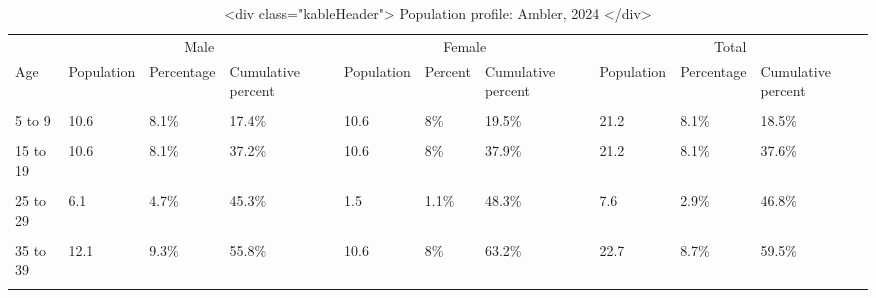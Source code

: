 \documentclass[
]{article}
\begin{document}
\begin{table}
\centering\centering
\caption{\label{tab:pop profile table}<div class="kableHeader"> Population profile: Ambler, 2024 </div>}
\centering
\begin{tabular}[t]{l|l|l|l|l|l|l|l|l|l}
\hline
\multicolumn{1}{c|}{ } & \multicolumn{3}{c|}{Male} & \multicolumn{3}{c|}{Female} & \multicolumn{3}{c}{Total} \\
\cline{2-4} \cline{5-7} \cline{8-10}
Age & Population & Percentage & Cumulative percent & Population & Percent & Cumulative percent & Population & Percentage & Cumulative percent\\
\hline
\cellcolor{gray!10}{0 to 4} & \cellcolor{gray!10}{12.1} & \cellcolor{gray!10}{9.3\%} & \cellcolor{gray!10}{9.3\%} & \cellcolor{gray!10}{15.2} & \cellcolor{gray!10}{11.5\%} & \cellcolor{gray!10}{11.5\%} & \cellcolor{gray!10}{27.3} & \cellcolor{gray!10}{10.4\%} & \cellcolor{gray!10}{10.4\%}\\
\hline
5 to 9 & 10.6 & 8.1\% & 17.4\% & 10.6 & 8\% & 19.5\% & 21.2 & 8.1\% & 18.5\%\\
\hline
\cellcolor{gray!10}{10 to 14} & \cellcolor{gray!10}{15.2} & \cellcolor{gray!10}{11.6\%} & \cellcolor{gray!10}{29.1\%} & \cellcolor{gray!10}{13.6} & \cellcolor{gray!10}{10.3\%} & \cellcolor{gray!10}{29.9\%} & \cellcolor{gray!10}{28.8} & \cellcolor{gray!10}{11\%} & \cellcolor{gray!10}{29.5\%}\\
\hline
15 to 19 & 10.6 & 8.1\% & 37.2\% & 10.6 & 8\% & 37.9\% & 21.2 & 8.1\% & 37.6\%\\
\hline
\cellcolor{gray!10}{20 to 24} & \cellcolor{gray!10}{4.5} & \cellcolor{gray!10}{3.5\%} & \cellcolor{gray!10}{40.7\%} & \cellcolor{gray!10}{12.1} & \cellcolor{gray!10}{9.2\%} & \cellcolor{gray!10}{47.1\%} & \cellcolor{gray!10}{16.7} & \cellcolor{gray!10}{6.4\%} & \cellcolor{gray!10}{43.9\%}\\
\hline
25 to 29 & 6.1 & 4.7\% & 45.3\% & 1.5 & 1.1\% & 48.3\% & 7.6 & 2.9\% & 46.8\%\\
\hline
\cellcolor{gray!10}{30 to 34} & \cellcolor{gray!10}{1.5} & \cellcolor{gray!10}{1.2\%} & \cellcolor{gray!10}{46.5\%} & \cellcolor{gray!10}{9.1} & \cellcolor{gray!10}{6.9\%} & \cellcolor{gray!10}{55.2\%} & \cellcolor{gray!10}{10.6} & \cellcolor{gray!10}{4\%} & \cellcolor{gray!10}{50.9\%}\\
\hline
35 to 39 & 12.1 & 9.3\% & 55.8\% & 10.6 & 8\% & 63.2\% & 22.7 & 8.7\% & 59.5\%\\
\hline
\cellcolor{gray!10}{40 to 44} & \cellcolor{gray!10}{12.1} & \cellcolor{gray!10}{9.3\%} & \cellcolor{gray!10}{65.1\%} & \cellcolor{gray!10}{15.2} & \cellcolor{gray!10}{11.5\%} & \cellcolor{gray!10}{74.7\%} & \cellcolor{gray!10}{27.3} & \cellcolor{gray!10}{10.4\%} & \cellcolor{gray!10}{69.9\%}\\

\end{tabular}
\end{table}
\end{document}
